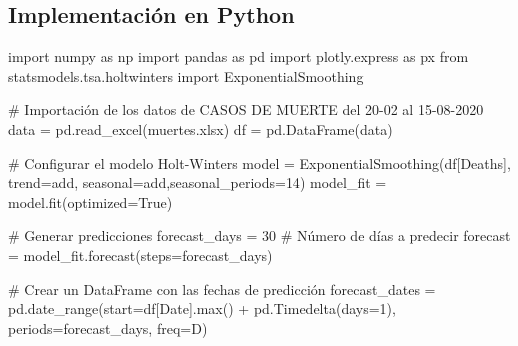 \documentclass[
  us-letterpaper,
]{scrreprt}
\newenvironment{Shaded}{\begin{snugshade}}{\end{snugshade}}
\newcommand{\BuiltInTok}[1]{\textcolor[rgb]{0.00,0.23,0.31}{#1}}
\newcommand{\CommentTok}[1]{\textcolor[rgb]{0.37,0.37,0.37}{#1}}
\newcommand{\DecValTok}[1]{\textcolor[rgb]{0.68,0.00,0.00}{#1}}
\newcommand{\ImportTok}[1]{\textcolor[rgb]{0.00,0.46,0.62}{#1}}
\newcommand{\NormalTok}[1]{\textcolor[rgb]{0.00,0.23,0.31}{#1}}
\newcommand{\OperatorTok}[1]{\textcolor[rgb]{0.37,0.37,0.37}{#1}}
\newcommand{\StringTok}[1]{\textcolor[rgb]{0.13,0.47,0.30}{#1}}
\newcommand{\VariableTok}[1]{\textcolor[rgb]{0.07,0.07,0.07}{#1}}
\theoremstyle{plain}
\theoremstyle{definition}
\theoremstyle{definition}
\theoremstyle{plain}
\theoremstyle{remark}
\begin{document}
\subsection{Implementación en
Python}\label{implementaciuxf3n-en-python-1}

\begin{tcolorbox}[enhanced jigsaw, bottomtitle=1mm, coltitle=black, breakable, leftrule=.75mm, left=2mm, rightrule=.15mm, titlerule=0mm, toprule=.15mm, toptitle=1mm, colback=white, colframe=quarto-callout-warning-color-frame, title={▸Código}, colbacktitle=quarto-callout-warning-color!10!white, arc=.35mm, bottomrule=.15mm, opacitybacktitle=0.6, opacityback=0]

\begin{Shaded}
\begin{Highlighting}[]
\ImportTok{import}\NormalTok{ numpy }\ImportTok{as}\NormalTok{ np }
\ImportTok{import}\NormalTok{ pandas }\ImportTok{as}\NormalTok{ pd }
\ImportTok{import}\NormalTok{ plotly.express }\ImportTok{as}\NormalTok{ px }
\ImportTok{from}\NormalTok{ statsmodels.tsa.holtwinters }\ImportTok{import}\NormalTok{ ExponentialSmoothing}

\CommentTok{\# Importación de los datos de CASOS DE MUERTE del 20{-}02 al 15{-}08{-}2020}
\NormalTok{data }\OperatorTok{=}\NormalTok{ pd.read\_excel(}\StringTok{\textquotesingle{}muertes.xlsx\textquotesingle{}}\NormalTok{)}
\NormalTok{df }\OperatorTok{=}\NormalTok{ pd.DataFrame(data)}

\CommentTok{\# Configurar el modelo Holt{-}Winters}
\NormalTok{model }\OperatorTok{=}\NormalTok{ ExponentialSmoothing(df[}\StringTok{\textquotesingle{}Deaths\textquotesingle{}}\NormalTok{], trend}\OperatorTok{=}\StringTok{\textquotesingle{}add\textquotesingle{}}\NormalTok{, }
\NormalTok{seasonal}\OperatorTok{=}\StringTok{\textquotesingle{}add\textquotesingle{}}\NormalTok{,seasonal\_periods}\OperatorTok{=}\DecValTok{14}\NormalTok{)}
\NormalTok{model\_fit }\OperatorTok{=}\NormalTok{ model.fit(optimized}\OperatorTok{=}\VariableTok{True}\NormalTok{)}

\CommentTok{\# Generar predicciones}
\NormalTok{forecast\_days }\OperatorTok{=} \DecValTok{30}  \CommentTok{\# Número de días a predecir}
\NormalTok{forecast }\OperatorTok{=}\NormalTok{ model\_fit.forecast(steps}\OperatorTok{=}\NormalTok{forecast\_days)}

\CommentTok{\# Crear un DataFrame con las fechas de predicción}
\NormalTok{forecast\_dates }\OperatorTok{=}\NormalTok{ pd.date\_range(start}\OperatorTok{=}\NormalTok{df[}\StringTok{\textquotesingle{}Date\textquotesingle{}}\NormalTok{].}\BuiltInTok{max}\NormalTok{() }\OperatorTok{+} 
\NormalTok{pd.Timedelta(days}\OperatorTok{=}\DecValTok{1}\NormalTok{), periods}\OperatorTok{=}\NormalTok{forecast\_days, freq}\OperatorTok{=}\StringTok{\textquotesingle{}D\textquotesingle{}}\NormalTok{)}


\end{Highlighting}
\end{Shaded}
\end{tcolorbox}
\end{document}
